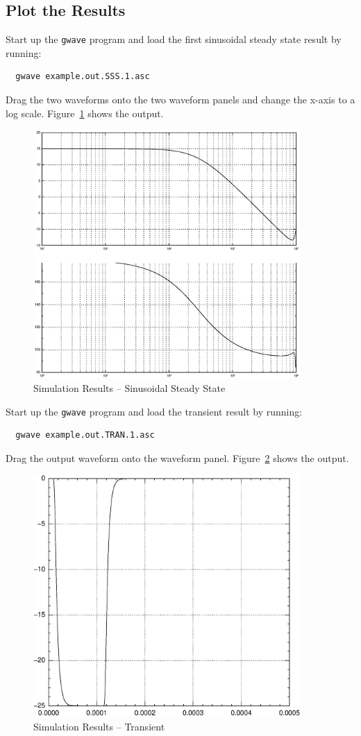 \documentclass{article}
\begin{document}
\subsection{Plot the Results}
Start up the {\tt gwave} program and load the first sinusoidal steady
state result by running:
\begin{verbatim}
  gwave example.out.SSS.1.asc
\end{verbatim}
Drag the two waveforms onto the two waveform panels and change the
x-axis to a log scale.  Figure~\ref{fig:gwave_out_sss} shows the output.
\begin{figure}
\begin{center}
\includegraphics[width=4in]{gwave_out_sss.ps}
\end{center}
\caption{Simulation Results -- Sinusoidal Steady State}
\label{fig:gwave_out_sss}
\end{figure}
Start up the {\tt gwave} program and load the transient
result by running:
\begin{verbatim}
  gwave example.out.TRAN.1.asc
\end{verbatim}
Drag the output waveform onto the waveform panel.
Figure~\ref{fig:gwave_out_tran} shows the output.
\begin{figure}
\begin{center}
\includegraphics[width=4in]{gwave_out_tran.ps}
\end{center}
\caption{Simulation Results -- Transient}
\label{fig:gwave_out_tran}
\end{figure}
\end{document}

